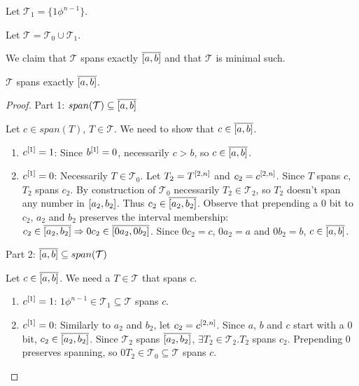 \documentclass{article}
\begin{document}
Let $\mathcal{T}_1 = \{ 1 \phi^{n-1} \}$.

Let $\mathcal{T} = \mathcal{T}_0 \cup \mathcal{T}_1$.

We claim that $\mathcal{T}$ spans exactly $\overline{[a, b]}$
and that $\mathcal{T}$ is minimal such. %

\begin{theorem}
$\mathcal{T}$ spans exactly $\overline{[a, b]}$.
\end{theorem}

\begin{proof}
Part 1: $span(\mathcal{T}) \subseteq \overline{[a, b]}$

Let $c \in span(T)$, $T \in \mathcal{T}$.
We need to show that $c \in \overline{[a, b]}$.

\begin{enumerate}
\item $c^{[1]} = 1$: Since $b^{[1]} = 0$, necessarily $c > b$, so $c \in \overline{[a, b]}$.
\item $c^{[1]} = 0$: Necessarily $T \in \mathcal{T}_0$.
Let $T_2 = T^{[2, n]}$ and $c_2 = c^{[2, n]}$.
Since $T$ spans $c$, $T_2$ spans $c_2$.
By construction of $\mathcal{T}_0$ necessarily $T_2 \in \mathcal{T}_2$,
so $T_2$ doesn't span any number in $[a_2, b_2]$.
Thus $c_2 \in \overline{[a_2, b_2]}$.
Observe that prepending a $0$ bit to $c_2$, $a_2$ and $b_2$ preserves the interval membership:
$c_2 \in \overline{[a_2, b_2]} \Rightarrow 0 c_2 \in \overline{[0 a_2, 0 b_2]}$.
Since $0 c_2 = c$, $0 a_2 = a$ and $0 b_2 = b$,
$c \in \overline{[a, b]}$.
\end{enumerate}

Part 2: $\overline{[a, b]} \subseteq span(\mathcal{T})$

Let $c \in \overline{[a, b]}$.
We need a $T \in \mathcal{T}$ that spans $c$.

\begin{enumerate}
\item $c^{[1]} = 1$: $1 \phi^{n-1} \in \mathcal{T}_1 \subseteq \mathcal{T}$ spans $c$.
\item $c^{[1]} = 0$:
Similarly to $a_2$ and $b_2$, let $c_2 = c^{[2, n]}$.
Since $a$, $b$ and $c$ start with a $0$ bit,
$c_2 \in \overline{[a_2, b_2]}$.
Since $\mathcal{T}_2$ spans $\overline{[a_2, b_2]}$,
$\exists T_2 \in \mathcal{T}_2 . T_2$ spans $c_2$.
Prepending $0$ preserves spanning,
so $0 T_2 \in \mathcal{T}_0 \subseteq \mathcal{T}$ spans $c$.
\end{enumerate}
\end{proof}
\end{document}
